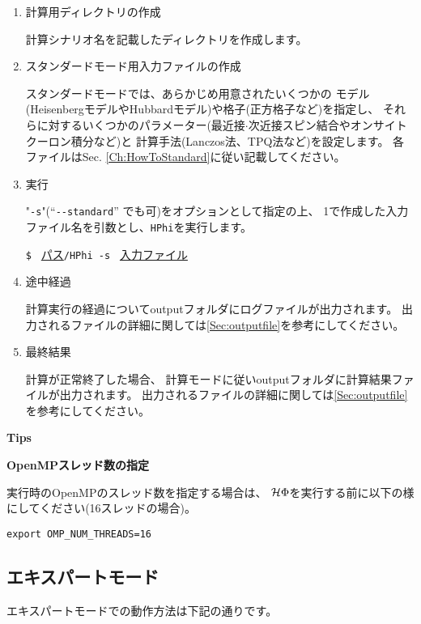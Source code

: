  \begin{enumerate}
   \item  計算用ディレクトリの作成

計算シナリオ名を記載したディレクトリを作成します。

   \item  スタンダードモード用入力ファイルの作成

スタンダードモードでは、あらかじめ用意されたいくつかの
モデル(HeisenbergモデルやHubbardモデル)や格子(正方格子など)を指定し、
それらに対するいくつかのパラメーター(最近接$\cdot$次近接スピン結合やオンサイトクーロン積分など)と
計算手法(Lanczos法、TPQ法など)を設定します。
各ファイルはSec. \ref{Ch:HowToStandard}に従い記載してください。

 \item  実行

"\verb|-s|"(``\verb|--standard|'' でも可)をオプションとして指定の上、
1で作成した入力ファイル名を引数とし、\verb|HPhi|を実行します。

\verb|$ | \underline{パス}\verb|/HPhi -s | \underline{入力ファイル}

\item 途中経過

計算実行の経過についてoutputフォルダにログファイルが出力されます。
出力されるファイルの詳細に関しては\ref{Sec:outputfile}を参考にしてください。

\item 最終結果

計算が正常終了した場合、
計算モードに従いoutputフォルダに計算結果ファイルが出力されます。
出力されるファイルの詳細に関しては\ref{Sec:outputfile}を参考にしてください。
\end{enumerate}

\begin{screen}
\Large 
{\bf Tips}
\normalsize

{\bf OpenMPスレッド数の指定}

実行時のOpenMPのスレッド数を指定する場合は、
$\mathcal{H} \Phi$を実行する前に以下の様にしてください(16スレッドの場合)。
\begin{verbatim}
export OMP_NUM_THREADS=16
\end{verbatim}

\end{screen}

\newpage
\subsection{エキスパートモード}
エキスパートモードでの動作方法は下記の通りです。

